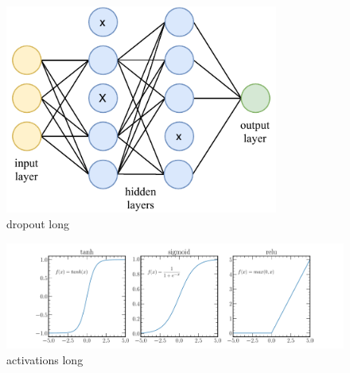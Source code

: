 \begin{figure} %
    \includegraphics[width=0.8\textwidth]{diagrams/6-cvn/dropout.pdf}
    \caption[dropout short]
    {dropout long}
    \label{fig:dropout}
\end{figure} %

\begin{figure} %
    \includegraphics[width=\textwidth]{diagrams/6-cvn/activations.pdf}
    \caption[activations short]
    {activations long}
    \label{fig:activations}
\end{figure} %

